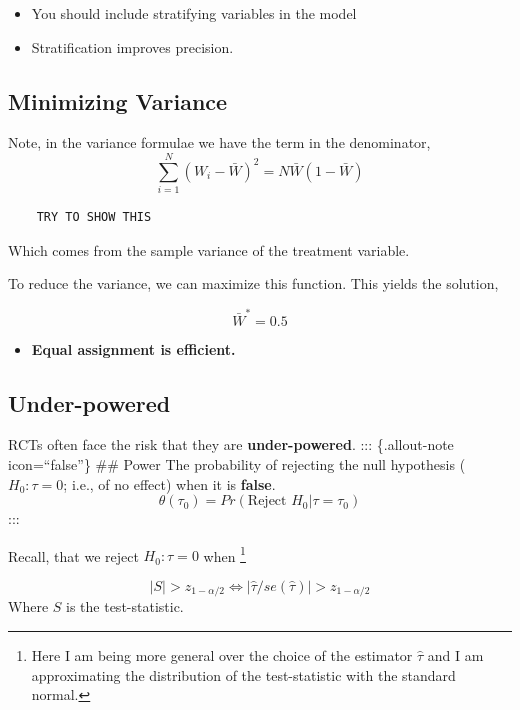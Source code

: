 \documentclass[
  letterpaper,
  DIV=11,
  numbers=noendperiod]{scrreprt}
\providecommand{\tightlist}{%
  \setlength{\itemsep}{0pt}\setlength{\parskip}{0pt}}\usepackage{longtable,booktabs,array}
\theoremstyle{definition}
\theoremstyle{remark}
\begin{document}
\par

\begin{itemize}
\tightlist
\item
  You should include stratifying variables in the model
\item
  Stratification improves precision.
\end{itemize}

\subsection{Minimizing Variance}\label{minimizing-variance}

Note, in the variance formulae we have the term in the denominator, \[
            \sum_{i=1}^N(W_i-\bar{W})^2 = N\bar{W}(1-\bar{W})
\]

\begin{verbatim}
    TRY TO SHOW THIS
\end{verbatim}

Which comes from the sample variance of the treatment variable.

\par

To reduce the variance, we can maximize this function. This yields the
solution,

\[
        \bar{W}^*=0.5
\]

\begin{itemize}
\tightlist
\item
  \textbf{Equal assignment is efficient.}
\end{itemize}

\subsection{Under-powered}\label{under-powered}

RCTs often face the risk that they are \textbf{under-powered}. :::
\{.allout-note icon=``false''\} \#\# Power The probability of rejecting
the null hypothesis (\(H_0: \tau=0\); i.e., of no effect) when it is
\textbf{false}. \[
                \theta(\tau_0)=Pr(\text{Reject }H_0|\tau=\tau_0)
\] :::

Recall, that we reject \(H_0: \tau=0\) when \footnote{Here I am being
  more general over the choice of the estimator \(\hat{\tau}\) and I am
  approximating the distribution of the test-statistic with the standard
  normal.}

\[
            |S|>z_{1-\alpha/2}\Longleftrightarrow |\hat{\tau}/se(\hat{\tau})|>z_{1-\alpha/2}
\] Where \(S\) is the test-statistic.
\end{document}

